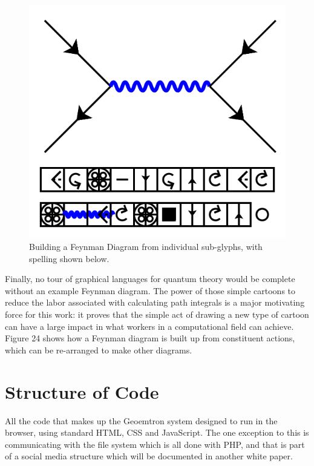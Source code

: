 \documentclass[11pt]{article}
\begin{document}
\begin{figure}

\includegraphics[width=\linewidth]{figures/figure24_feynman1.png}

\caption{Building a Feynman Diagram from individual sub-glyphs, with spelling shown below.}
\end{figure}




    Finally, no tour of graphical languages for quantum theory would be complete without an example Feynman diagram.  The power of those simple cartoons to reduce the labor associated with calculating path integrals is a major motivating force for this work: it proves that the simple act of drawing a new type of cartoon can have a large impact in what workers in a computational field can achieve.  Figure 24 shows how a Feynman diagram is built up from constituent actions, which can be re-arranged to make other diagrams. 

\section{Structure of Code}


    All the code that makes up the Geoemtron system designed to run in the browser, using standard HTML, CSS and JavaScript.  The one exception to this is communicating with the file system which is all done with PHP, and that is part of a social media structure which will be documented in another white paper.  
\end{document}

